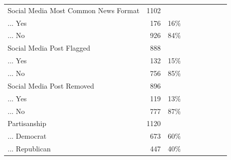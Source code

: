 \begin{table}[!htbp]
{\begin{tabular}{lrrrrrrrr}
Social Media Most Common News Format & 1102 &  &  &  &  &  &  &  \\ 
... Yes & 176 & 16\% &  &  &  &  &  &  \\ 
... No & 926 & 84\% &  &  &  &  &  &  \\ 
Social Media Post Flagged & 888 &  &  &  &  &  &  &  \\ 
... Yes & 132 & 15\% &  &  &  &  &  &  \\ 
... No & 756 & 85\% &  &  &  &  &  &  \\ 
Social Media Post Removed & 896 &  &  &  &  &  &  &  \\ 
... Yes & 119 & 13\% &  &  &  &  &  &  \\ 
... No & 777 & 87\% &  &  &  &  &  &  \\ 
Partisanship & 1120 &  &  &  &  &  &  &  \\ 
... Democrat & 673 & 60\% &  &  &  &  &  &  \\ 
... Republican & 447 & 40\% &  &  &  &  &  & \\ 
\hline
\hline
\end{tabular}
}
\end{table}


